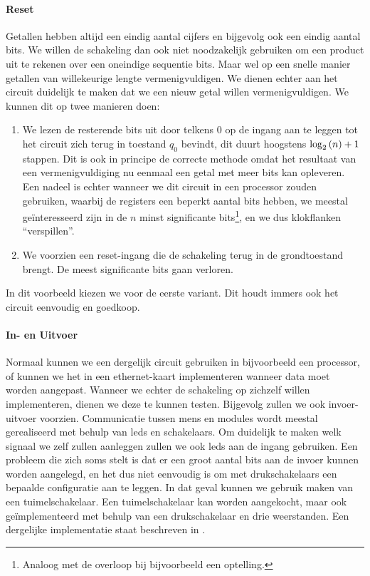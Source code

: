 \paragraph{Reset}
Getallen hebben altijd een eindig aantal cijfers en bijgevolg ook een eindig aantal bits. We willen de schakeling dan ook niet noodzakelijk gebruiken om een product uit te rekenen over een oneindige sequentie bits. Maar wel op een snelle manier getallen van willekeurige lengte vermenigvuldigen. We dienen echter aan het circuit duidelijk te maken dat we een nieuw getal willen vermenigvuldigen. We kunnen dit op twee manieren doen:
\begin{enumerate}
 \item We lezen de resterende bits uit door telkens $0$ op de ingang aan te leggen tot het circuit zich terug in toestand $q_0$ bevindt, dit duurt hoogstens $\log_2\left( n \right)+1$ stappen. Dit is ook in principe de correcte methode omdat het resultaat van een vermenigvuldiging nu eenmaal een getal met meer bits kan opleveren. Een nadeel is echter wanneer we dit circuit in een processor zouden gebruiken, waarbij de registers een beperkt aantal bits hebben, we meestal ge\"interesseerd zijn in de $n$ minst significante bits\footnote{Analoog met de overloop bij bijvoorbeeld een optelling.}, en we dus klokflanken ``verspillen''.
 \item We voorzien een reset-ingang die de schakeling terug in de grondtoestand brengt. De meest significante bits gaan verloren.
\end{enumerate}
In dit voorbeeld kiezen we voor de eerste variant. Dit houdt immers ook het circuit eenvoudig en goedkoop.
\paragraph{In- en Uitvoer}
Normaal kunnen we een dergelijk circuit gebruiken in bijvoorbeeld een processor, of kunnen we het in een ethernet-kaart implementeren wanneer data moet worden aangepast. Wanneer we echter de schakeling op zichzelf willen implementeren, dienen we deze te kunnen testen. Bijgevolg zullen we ook invoer-uitvoer voorzien. Communicatie tussen mens en modules wordt meestal gerealiseerd met behulp van leds en schakelaars. Om duidelijk te maken welk signaal we zelf zullen aanleggen zullen we ook leds aan de ingang gebruiken. Een probleem die zich soms stelt is dat er een groot aantal bits aan de invoer kunnen worden aangelegd, en het dus niet eenvoudig is om met drukschakelaars een bepaalde configuratie aan te leggen. In dat geval kunnen we gebruik maken van een tuimelschakelaar. Een tuimelschakelaar kan worden aangekocht, maar ook ge\"implementeerd met behulp van een drukschakelaar en drie weerstanden. Een dergelijke implementatie staat beschreven in .
